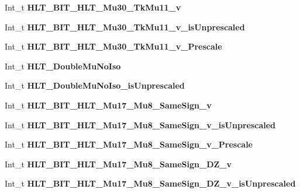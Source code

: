 \begin{DoxyCompactItemize}
Int\+\_\+t {\bfseries H\+L\+T\+\_\+\+B\+I\+T\+\_\+\+H\+L\+T\+\_\+\+Mu30\+\_\+\+Tk\+Mu11\+\_\+v}
\item 
\hypertarget{classMiniTree_adb6d7c5d8a9ab6c6db3cc9565a6e709a}{}\label{classMiniTree_adb6d7c5d8a9ab6c6db3cc9565a6e709a} 
Int\+\_\+t {\bfseries H\+L\+T\+\_\+\+B\+I\+T\+\_\+\+H\+L\+T\+\_\+\+Mu30\+\_\+\+Tk\+Mu11\+\_\+v\+\_\+is\+Unprescaled}
\item 
\hypertarget{classMiniTree_a21f1fbf769c0952dd1a0b09dd6fb8c40}{}\label{classMiniTree_a21f1fbf769c0952dd1a0b09dd6fb8c40} 
Int\+\_\+t {\bfseries H\+L\+T\+\_\+\+B\+I\+T\+\_\+\+H\+L\+T\+\_\+\+Mu30\+\_\+\+Tk\+Mu11\+\_\+v\+\_\+\+Prescale}
\item 
\hypertarget{classMiniTree_ac4bc537d3d21dcf891e5b68527b85bb2}{}\label{classMiniTree_ac4bc537d3d21dcf891e5b68527b85bb2} 
Int\+\_\+t {\bfseries H\+L\+T\+\_\+\+Double\+Mu\+No\+Iso}
\item 
\hypertarget{classMiniTree_abce0dab880263dcab0e5f3125a2dbfd6}{}\label{classMiniTree_abce0dab880263dcab0e5f3125a2dbfd6} 
Int\+\_\+t {\bfseries H\+L\+T\+\_\+\+Double\+Mu\+No\+Iso\+\_\+is\+Unprescaled}
\item 
\hypertarget{classMiniTree_a4b12632c46fc2f1d2dfa959538b3f97d}{}\label{classMiniTree_a4b12632c46fc2f1d2dfa959538b3f97d} 
Int\+\_\+t {\bfseries H\+L\+T\+\_\+\+B\+I\+T\+\_\+\+H\+L\+T\+\_\+\+Mu17\+\_\+\+Mu8\+\_\+\+Same\+Sign\+\_\+v}
\item 
\hypertarget{classMiniTree_af60dcf46ee3a0cff853564171e43888e}{}\label{classMiniTree_af60dcf46ee3a0cff853564171e43888e} 
Int\+\_\+t {\bfseries H\+L\+T\+\_\+\+B\+I\+T\+\_\+\+H\+L\+T\+\_\+\+Mu17\+\_\+\+Mu8\+\_\+\+Same\+Sign\+\_\+v\+\_\+is\+Unprescaled}
\item 
\hypertarget{classMiniTree_a673bc907d6faae7df80618f815ae84db}{}\label{classMiniTree_a673bc907d6faae7df80618f815ae84db} 
Int\+\_\+t {\bfseries H\+L\+T\+\_\+\+B\+I\+T\+\_\+\+H\+L\+T\+\_\+\+Mu17\+\_\+\+Mu8\+\_\+\+Same\+Sign\+\_\+v\+\_\+\+Prescale}
\item 
\hypertarget{classMiniTree_a4d53e9aa1ad11306cda6885333f42dd9}{}\label{classMiniTree_a4d53e9aa1ad11306cda6885333f42dd9} 
Int\+\_\+t {\bfseries H\+L\+T\+\_\+\+B\+I\+T\+\_\+\+H\+L\+T\+\_\+\+Mu17\+\_\+\+Mu8\+\_\+\+Same\+Sign\+\_\+\+D\+Z\+\_\+v}
\item 
\hypertarget{classMiniTree_a5e7d3209c5aadb387d30ec7e84c6d0e2}{}\label{classMiniTree_a5e7d3209c5aadb387d30ec7e84c6d0e2} 
Int\+\_\+t {\bfseries H\+L\+T\+\_\+\+B\+I\+T\+\_\+\+H\+L\+T\+\_\+\+Mu17\+\_\+\+Mu8\+\_\+\+Same\+Sign\+\_\+\+D\+Z\+\_\+v\+\_\+is\+Unprescaled}
\item 

\end{DoxyCompactItemize}
